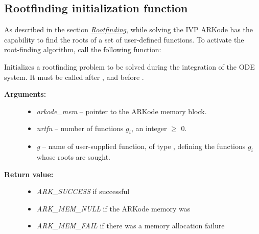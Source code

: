 \documentclass[letterpaper,10pt,english]{sphinxmanual}
\begin{document}
\subsection{Rootfinding initialization function}
\label{c_interface/User_callable:cinterface-rootfinding}\label{c_interface/User_callable:rootfinding-initialization-function}
As described in the section {\hyperref[Mathematics:mathematics-rootfinding]{\emph{Rootfinding}}}, while
solving the IVP ARKode has the capability to find the roots of a set
of user-defined functions.  To activate the root-finding algorithm,
call the following function:

\begin{fulllineitems}
\label{c_interface/User_callable:ARKodeRootInit}
Initializes a rootfinding problem to be solved during the
integration of the ODE system.  It must be called after
{\hyperref[c_interface/User_callable:ARKodeCreate]{}}, and before {\hyperref[c_interface/User_callable:ARKode]{}}.
\begin{description}
\item[{\textbf{Arguments:}}] \leavevmode\begin{itemize}
\item {} 
\emph{arkode\_mem} -- pointer to the ARKode memory block.

\item {} 
\emph{nrtfn} -- number of functions $g_i$, an integer $\ge$ 0.

\item {} 
\emph{g} -- name of user-supplied function, of type {\hyperref[c_interface/User_supplied:ARKRootFn]{}},
defining the functions $g_i$ whose roots are sought.

\end{itemize}

\item[{\textbf{Return value:}}] \leavevmode\begin{itemize}
\item {} 
\emph{ARK\_SUCCESS} if successful

\item {} 
\emph{ARK\_MEM\_NULL}  if the ARKode memory was 

\item {} 
\emph{ARK\_MEM\_FAIL}  if there was a memory allocation failure


\end{itemize}
\end{description}
\end{fulllineitems}
\end{document}
